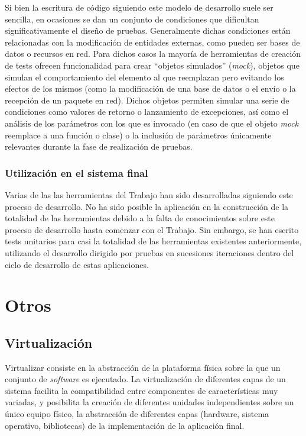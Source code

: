 Si bien la escritura de código siguiendo este modelo de desarrollo suele ser sencilla, en ocasiones se dan un conjunto de condiciones que dificultan significativamente el diseño de pruebas. Generalmente dichas condiciones están relacionadas con la modificación de entidades externas, como pueden ser bases de datos o recursos en red. Para dichos casos la mayoría de herramientas de creación de tests ofrecen funcionalidad para crear ``objetos simulados'' (\textit{mock}), objetos que simulan el comportamiento del elemento al que reemplazan pero evitando los efectos de los mismos (como la modificación de una base de datos o el envío o la recepción de un paquete en red). Dichos objetos permiten simular una serie de condiciones como valores de retorno o lanzamiento de excepciones, así como el análisis de los parámetros con los que es invocado (en caso de que el objeto \textit{mock} reemplace a una función o clase) o la inclusión de parámetros únicamente relevantes durante la fase de realización de pruebas.

\subsubsection{Utilización en el sistema final}

Varias de las las herramientas del Trabajo han sido desarrolladas siguiendo este proceso de desarrollo. No ha sido posible la aplicación en la construcción de la totalidad de las herramientas debido a la falta de conocimientos sobre este proceso de desarrollo hasta comenzar con el Trabajo. Sin embargo, se han escrito tests unitarios para casi la totalidad de las herramientas existentes anteriormente, utilizando el desarrollo dirigido por pruebas en sucesiones iteraciones dentro del ciclo de desarrollo de estas aplicaciones.


\section{Otros}

\subsection{Virtualización}
\label{teoria:virtualizacion}

Virtualizar consiste en la abstracción de la plataforma física sobre la que un conjunto de \textit{software} es ejecutado. La virtualización de diferentes capas de un sistema facilita la compatibilidad entre componentes de características muy variadas, y posibilita la creación de diferentes unidades independientes sobre un único equipo físico, la abstracción de diferentes capas (hardware, sistema operativo, bibliotecas) de la implementación de la aplicación final.


